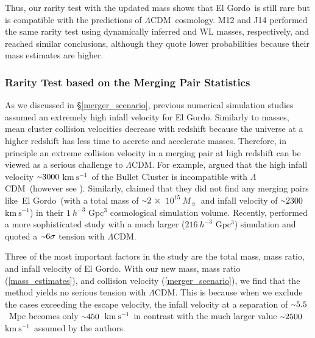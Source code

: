 \documentclass[twocolumn]{aastex631}
\newcommand{\elgordo}{El Gordo}
\newcommand{\LCDM}{$\Lambda$CDM}
\newcommand{\mytilde}{\raise.19ex\hbox{$\scriptstyle\sim$}}
\newcommand{\kms}{$\mbox{km}~\mbox{s}^{-1}$}
\newcommand{\solarmA}{$10^{15}~M_{\sun}$}
\begin{document}
Thus, our rarity test with the updated mass shows that \elgordo~is still rare but is compatible with the predictions of \LCDM~cosmology. 
M12 and J14 performed the same rarity test using dynamically inferred and WL masses, respectively, and reached similar conclusions, although they quote lower probabilities because their mass estimates are higher.


\subsubsection{Rarity Test based on the Merging Pair Statistics} \label{rarity_mass_velocity}
As we discussed in \S\ref{merger_scenario}, previous numerical simulation studies assumed an extremely high infall velocity for \elgordo. 
Similarly to masses, mean cluster collision velocities decrease with redshift because the universe at a higher redshift has less time to accrete and accelerate masses. 
Therefore, in principle an extreme collision velocity in a merging pair at high redshift can be viewed as a serious challenge to \LCDM. 
For example, \cite{Lee2010} argued that the high infall velocity $\mytilde3000~$\kms~of the Bullet Cluster is incompatible with \LCDM~(however see \citealt{Bouillot2015}). 
Similarly, \cite{Katz2013} claimed that they did not find any merging pairs like~\elgordo~(with a total mass of $\mytilde2~\times$~\solarmA~and infall velocity of $\mytilde2300$~\kms) in their $1~h^{-3}$ Gpc$^3$ cosmological simulation volume. 
Recently, \cite{Asencio2021} performed a more sophisticated study with a much larger ($216~h^{-3}$ Gpc$^3$) simulation and quoted a $\mytilde6\sigma$ tension with \LCDM.


Three of the most important factors in the \cite{Asencio2021} study are the total mass, mass ratio, and infall velocity of \elgordo. 
With our new mass, mass ratio (\textsection\ref{mass_estimates}), and collision velocity (\textsection\ref{merger_scenario}), we find that the \cite{Asencio2021} method yields no serious tension with \LCDM. 
This is because when we exclude the cases exceeding the escape velocity, the infall velocity at a separation of $\mytilde5.5$~Mpc becomes only $\mytilde450$~\kms~in contrast with the much larger value $\mytilde2500$~\kms~assumed by the authors.
\end{document}
